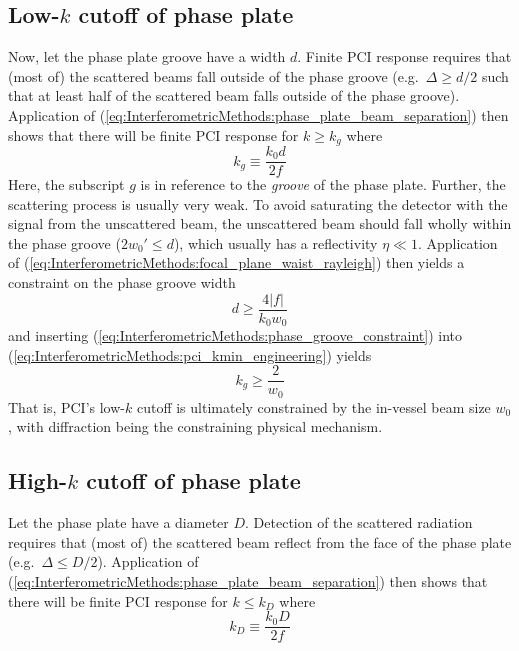 \subsection{Low-$k$ cutoff of phase plate}
Now, let the phase plate groove have a width $d$.
Finite PCI response requires that (most of) the scattered beams
fall outside of the phase groove (e.g.\ $\Delta \geq d / 2$
such that at least half of the scattered beam
falls outside of the phase groove).
Application of (\ref{eq:InterferometricMethods:phase_plate_beam_separation})
then shows that there will be finite PCI response
for $k \geq k_g$ where
\begin{equation}
  k_g \equiv \frac{k_0 d}{2 f}
  \label{eq:InterferometricMethods:pci_kmin_engineering}
\end{equation}
Here, the subscript $g$ is in reference
to the \emph{groove} of the phase plate.
Further, the scattering process is usually very weak.
To avoid saturating the detector with the signal from the unscattered beam,
the unscattered beam should fall wholly within the phase groove
($2 w_0' \leq d$), which usually has a reflectivity $\eta \ll 1$.
Application of (\ref{eq:InterferometricMethods:focal_plane_waist_rayleigh})
then yields a constraint on the phase groove width
\begin{equation}
  d \geq \frac{4 |f|}{k_0 w_0}
  \label{eq:InterferometricMethods:phase_groove_constraint}
\end{equation}
and inserting (\ref{eq:InterferometricMethods:phase_groove_constraint}) into
(\ref{eq:InterferometricMethods:pci_kmin_engineering}) yields
\begin{equation}
  k_g \geq \frac{2}{w_0}
  \label{eq:InterferometricMethods:pci_kmin_physics}
\end{equation}
\graffito{\textcolor{red}{%
  Note that this is the same limit as for true far-field spatial separation
  (i.e.\ when not using focal-plane spatial separation)}
}%
That is, PCI's low-$k$ cutoff
is ultimately constrained by the in-vessel beam size $w_0$,
with diffraction being the constraining physical mechanism.


\subsection{High-$k$ cutoff of phase plate}
Let the phase plate have a diameter $D$.
Detection of the scattered radiation
requires that (most of) the scattered beam reflect
from the face of the phase plate
(e.g.\ $\Delta \leq D / 2$).
Application of (\ref{eq:InterferometricMethods:phase_plate_beam_separation})
then shows that there will be finite PCI response for $k \leq k_D$ where
\begin{equation}
  k_D \equiv \frac{k_0 D}{2 f}
  \label{eq:InterferometricMethods:pci_kmax_engineering}
\end{equation}


